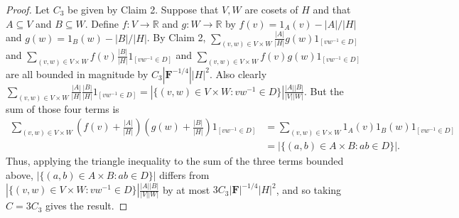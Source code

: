 \documentclass[10pt,a4paper]{amsart}
\begin{document}
\begin{proof}
Let $C_3$ be given by Claim 2. Suppose that $V,W$ are cosets of $H$ and that $A\subseteq V$ and $B\subseteq W$. Define $f:V\to \mathbb{R}$ and $g:W\to\mathbb{R}$ by $f(v)=1_{A}(v)-|A|/|H|$ and $g(w)=1_{B}(w)-|B|/|H|$. By Claim 2, $\sum_{(v,w)\in V\times W}\frac{|A|}{|H|}g(w)1_{[vw^{-1}\in D]}$ and $\sum_{(v,w)\in V\times W}f(v)\frac{|B|}{|H|}1_{[vw^{-1}\in D]}$ and $\sum_{(v,w)\in V\times W}f(v)g(w)1_{[vw^{-1}\in D]}$ are all bounded in magnitude by $C_3|\mathbf{F}^{-1/4}||H|^2$. Also clearly $\sum_{(v,w)\in V\times W}\frac{|A|}{|H|}\frac{|B|}{|H|}1_{[vw^{-1}\in D]}=|\{(v,w)\in V\times W:vw^{-1}\in D\}|\frac{|A||B|}{|V||W|}$. But the sum of those four terms is 
\begin{align*}\sum_{(v,w)\in V\times W}\left(f(v)+\frac{|A|}{|H|}\right)\left(g(w)+\frac{|B|}{|H|}\right)1_{[vw^{-1}\in D]}&=\sum_{(v,w)\in V\times W}1_A(v)1_B(w)1_{[vw^{-1}\in D]}\\&=|\{(a,b)\in A\times B:ab\in D\}|.
\end{align*}Thus, applying the triangle inequality to the sum of the three terms bounded above, $|\{(a,b)\in A\times B:ab\in D\}|$ differs from $|\{(v,w)\in V\times W:vw^{-1}\in D\}|\frac{|A||B|}{|V||W|}$ by at most $3C_3|\mathbf{F}|^{-1/4}|H|^2$, and so taking $C=3C_3$ gives the result.
\end{proof}
\end{document}
